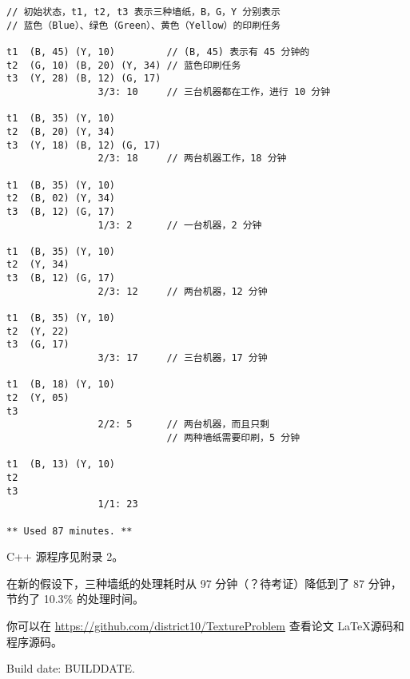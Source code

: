 \documentclass[bwprint]{cumcmthesis}    %
\begin{document}

\vspace{1.5cm}
\begin{lstlisting}[frame=single]
// 初始状态，t1, t2, t3 表示三种墙纸，B，G，Y 分别表示
// 蓝色（Blue）、绿色（Green）、黄色（Yellow）的印刷任务

t1  (B, 45) (Y, 10)         // (B, 45) 表示有 45 分钟的
t2  (G, 10) (B, 20) (Y, 34) // 蓝色印刷任务
t3  (Y, 28) (B, 12) (G, 17)
                3/3: 10     // 三台机器都在工作，进行 10 分钟

t1  (B, 35) (Y, 10)
t2  (B, 20) (Y, 34)
t3  (Y, 18) (B, 12) (G, 17)
                2/3: 18     // 两台机器工作，18 分钟

t1  (B, 35) (Y, 10)
t2  (B, 02) (Y, 34)
t3  (B, 12) (G, 17)
                1/3: 2      // 一台机器，2 分钟

t1  (B, 35) (Y, 10)
t2  (Y, 34)
t3  (B, 12) (G, 17)
                2/3: 12     // 两台机器，12 分钟

t1  (B, 35) (Y, 10)
t2  (Y, 22)
t3  (G, 17)
                3/3: 17     // 三台机器，17 分钟

t1  (B, 18) (Y, 10)
t2  (Y, 05)
t3
                2/2: 5      // 两台机器，而且只剩
                            // 两种墙纸需要印刷，5 分钟

t1  (B, 13) (Y, 10)
t2
t3
                1/1: 23

** Used 87 minutes. **
\end{lstlisting}

C++ 源程序见附录 2。

在新的假设下，三种墙纸的处理耗时从 97 分钟（？待考证）降低到了 87 分钟，节约了
10.3\% 的处理时间。

你可以在 \href{https://github.com/district10/TextureProblem}{https://github.com/district10/TextureProblem}
查看论文 \LaTeX 源码和程序源码。

Build date: BUILDDATE.
\end{document}
